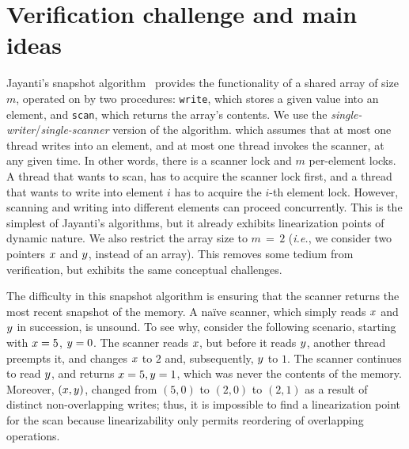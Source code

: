 \documentclass[a4paper,UKenglish]{lipics-v2016}
\newcommand{\ie}{\emph{i.e.}\xspace}
\theoremstyle{definition}
\begin{document}

\def\lineWrtStarts{1}
\def\lineWrtWrt{2}
\def\lineWrtChk{3}
\def\lineWrtIf{4}
\def\lineWrtFwd{5}
\def\lineWrtFnz{5'}

\def\lineScanStarts{6}
\def\lineScanSetsS{7}
\def\lineScanClearsX{8}
\def\lineScanClearsY{9}
\def\lineScanReadsX{10}
\def\lineScanReadsY{11}
\def\lineScanUnsetsS{12}
\def\lineScanReadsFX{13}
\def\lineScanReadsFY{14}
\def\lineScanChoosesRX{15}
\def\lineScanChoosesRY{16}
\def\lineScanRelinks{17}

\newcommand{\jywrite}{\texttt{write}\xspace}
\newcommand{\jyscan}{\texttt{scan}\xspace}


\section{Verification challenge and main ideas}
\label{sc:overview}

Jayanti's snapshot algorithm~\cite{Jayanti+STOC05} provides the
functionality of a shared array of size $m$, operated on by two
procedures: \jywrite, which stores a given value into an element, and
\jyscan, which returns the array's contents. We use the
\emph{single-writer}/\emph{single-scanner} version of the algorithm.
which assumes that at most one thread writes into an element, and at
most one thread invokes the scanner, at any given time. In other
words, there is a scanner lock and $m$ per-element locks. A thread
that wants to scan, has to acquire the scanner lock first, and a
thread that wants to write into element $i$ has to acquire the $i$-th
element lock. However, scanning and writing into different elements
can proceed concurrently.
% 
This is the simplest of Jayanti's algorithms, but it already exhibits
linearization points of dynamic nature. We also restrict the array
size to $m\,{=}\,2$ (\ie, we consider two pointers $x$ and $y$,
instead of an array). This removes some tedium from verification, but
exhibits the same conceptual challenges.
 
The difficulty in this snapshot algorithm is ensuring that the scanner
returns the most recent snapshot of the memory. A na\"{i}ve scanner, which
simply reads $x$ and $y$ in succession, is unsound. To see why,
consider the following scenario, starting with $x=5$, $y=0$. The
scanner reads $x$, but before it reads $y$, another thread preempts
it, and changes $x$ to $2$ and, subsequently, $y$ to $1$. The
scanner continues to read $y$, and returns $x=5, y=1$, which was
never the contents of the memory. Moreover, $(x, y)$, changed from
$(5,0)$ to $(2, 0)$ to $(2, 1)$ as a result of distinct
non-overlapping writes; thus, it is impossible to find a linearization
point for the scan because linearizability only permits reordering of
overlapping operations.
\end{document}
